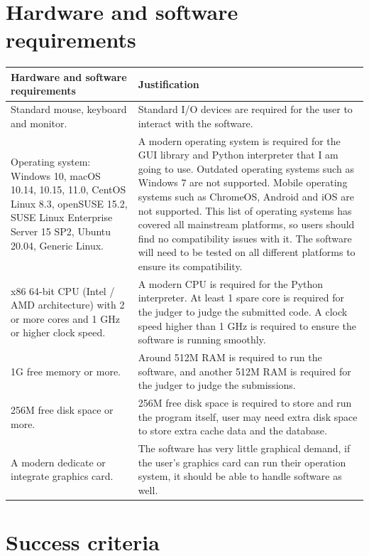 \documentclass[a4paper]{report}
\begin{document}
\section{Hardware and software requirements}

\begin{tabulary}{\linewidth}{|L|L|}
    \hline
    Hardware and software requirements & Justification \\
    \hline
    Standard mouse, keyboard and monitor. & Standard I/O devices are required for the user to interact with the software. \\
    \hline
    Operating system: Windows 10, macOS 10.14, 10.15, 11.0, CentOS Linux 8.3, openSUSE 15.2, SUSE Linux Enterprise Server 15 SP2, Ubuntu 20.04, Generic Linux. & A modern operating system is required for the GUI library and Python interpreter that I am going to use. Outdated operating systems such as Windows 7 are not supported. Mobile operating systems such as ChromeOS, Android and iOS are not supported. This list of operating systems has covered all mainstream platforms, so users should find no compatibility issues with it. The software will need to be tested on all different platforms to ensure its compatibility. \\
    \hline
    x86 64-bit CPU (Intel / AMD architecture) with 2 or more cores and 1 GHz or higher clock speed. & A modern CPU is required for the Python interpreter. At least 1 spare core is required for the judger to judge the submitted code. A clock speed higher than 1 GHz is required to ensure the software is running smoothly. \\
    \hline
    1G free memory or more. & Around 512M RAM is required to run the software, and another 512M RAM is required for the judger to judge the submissions. \\
    \hline
    256M free disk space or more. & 256M free disk space is required to store and run the program itself, user may need extra disk space to store extra cache data and the database. \\
    \hline
    A modern dedicate or integrate graphics card. & The software has very little graphical demand, if the user's graphics card can run their operation system, it should be able to handle software as well. \\
    \hline
\end{tabulary}

\section{Success criteria}
\end{document}
